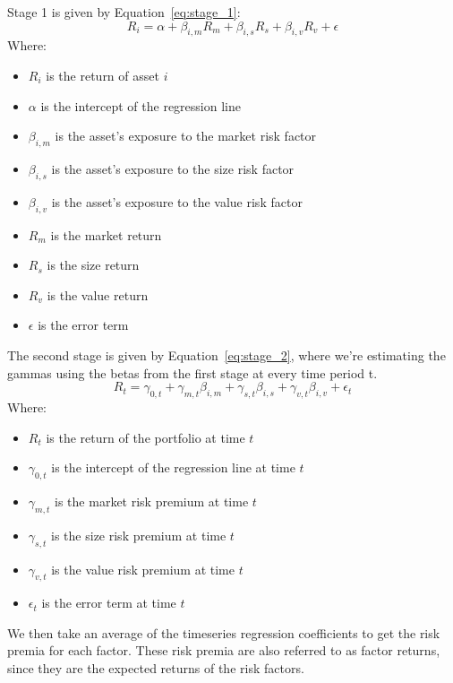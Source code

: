 Stage 1 is given by Equation~{\ref{eq:stage_1}}:
\begin{equation}
    \label{eq:stage_1}
    R_i = \alpha + \beta_{i,m} R_m + \beta_{i,s} R_s + \beta_{i,v} R_v + \epsilon
\end{equation}
Where:
\begin{itemize}
    \item $R_i$ is the return of asset $i$
    \item $\alpha$ is the intercept of the regression line
    \item $\beta_{i,m}$ is the asset's exposure to the market risk factor
    \item $\beta_{i,s}$ is the asset's exposure to the size risk factor
    \item $\beta_{i,v}$ is the asset's exposure to the value risk factor
    \item $R_m$ is the market return
    \item $R_s$ is the size return
    \item $R_v$ is the value return
    \item $\epsilon$ is the error term
\end{itemize}
The second stage is given by Equation~{\ref{eq:stage_2}}, where we're estimating the gammas using the betas from the first stage at every time period
t.
\begin{equation}
    \label{eq:stage_2}
    R_t = \gamma_{0,t} + \gamma_{m,t} \beta_{i,m} + \gamma_{s,t} \beta_{i,s} + \gamma_{v,t} \beta_{i,v} + \epsilon_t
\end{equation}
Where:
\begin{itemize}
    \item $R_t$ is the return of the portfolio at time $t$
    \item $\gamma_{0,t}$ is the intercept of the regression line at time $t$
    \item $\gamma_{m,t}$ is the market risk premium at time $t$
    \item $\gamma_{s,t}$ is the size risk premium at time $t$
    \item $\gamma_{v,t}$ is the value risk premium at time $t$
    \item $\epsilon_t$ is the error term at time $t$
\end{itemize}

We then take an average of the timeseries regression coefficients to get the risk premia for each factor.
These risk premia are also referred to as factor returns, since they are the expected returns of the risk factors.

